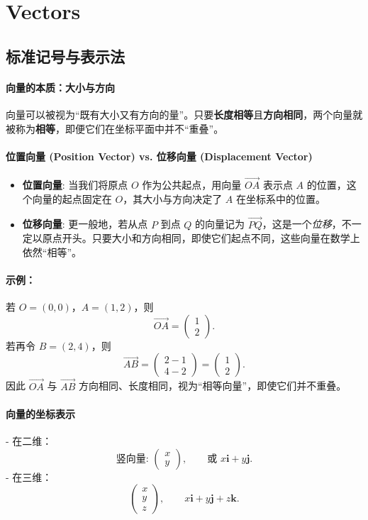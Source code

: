 \documentclass[8pt,a4paper,twoside]{tau-class/tau}
\begin{document}
\section{Vectors}

\subsection{标准记号与表示法}

\paragraph{向量的本质：大小与方向}
向量可以被视为“既有大小又有方向的量”。只要\textbf{长度相等}且\textbf{方向相同}，两个向量就被称为\textbf{相等}，即便它们在坐标平面中并不“重叠”。

\paragraph{位置向量 (Position Vector) vs. 位移向量 (Displacement Vector)}
\begin{itemize}
  \item \textbf{位置向量}: 当我们将原点 \(O\) 作为公共起点，用向量 \(\overrightarrow{OA}\) 表示点 \(A\) 的位置，这个向量的起点固定在 \(O\)，其大小与方向决定了 \(A\) 在坐标系中的位置。
  \item \textbf{位移向量}: 更一般地，若从点 \(P\) 到点 \(Q\) 的向量记为 \(\overrightarrow{PQ}\)，这是一个\textit{位移}，不一定以原点开头。只要大小和方向相同，即使它们起点不同，这些向量在数学上依然“相等”。
\end{itemize}

\paragraph{示例：}
若 \(O=(0,0)\)，\(A=(1,2)\)，则
\[
\overrightarrow{OA} = \begin{pmatrix}1\\2\end{pmatrix}.
\]
若再令 \(B=(2,4)\)，则
\[
\overrightarrow{AB}=\begin{pmatrix}2−1\\4−2\end{pmatrix}
=\begin{pmatrix}1\\2\end{pmatrix}.
\]
因此 \(\overrightarrow{OA}\) 与 \(\overrightarrow{AB}\) 方向相同、长度相同，视为“相等向量”，即使它们并不重叠。

\paragraph{向量的坐标表示}
- 在二维：
\[
\text{竖向量: } \begin{pmatrix} x\\[4pt] y\end{pmatrix}, 
\qquad
\text{或 }
x\mathbf{i}+y\mathbf{j}.
\]
- 在三维：
\[
\begin{pmatrix} x\\[2pt] y\\[2pt] z\end{pmatrix},
\qquad
x\mathbf{i}+y\mathbf{j}+z\mathbf{k}.
\]
\end{document}
